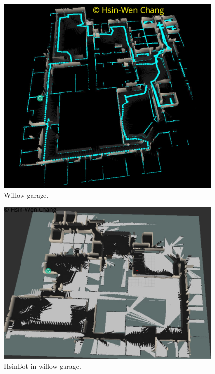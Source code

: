 \documentclass[10pt,journal,compsoc]{IEEEtran}
\begin{document}
\begin{figure}[thpb]
      \centering
      \includegraphics[width=\linewidth]{willowRTAB.png}
      \caption{Willow garage.}
      \label{fig:robot1}
\end{figure}
\begin{figure}[thpb]
      \centering
      \includegraphics[width=\linewidth]{RViz.png}
      \caption{HsinBot in willow garage.}
      \label{fig:robot1}
\end{figure}
\end{document}

